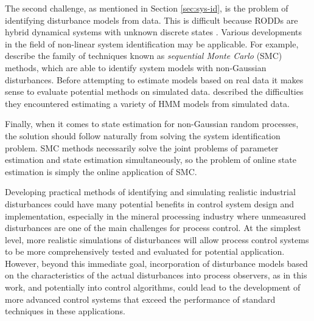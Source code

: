 The second challenge, as mentioned in Section \ref{sec:sys-id}, is the problem of identifying disturbance models from data. This is difficult because \gls{RODD}s are hybrid dynamical systems with unknown discrete states \citep{sworder_boyd_1999}. Various developments in the field of non-linear system identification may be applicable. For example, \cite{schon_sequential_2015} describe the family of techniques known as \textit{sequential Monte Carlo} (\gls{SMC}) methods, which are able to identify system models with non-Gaussian disturbances. Before attempting to estimate models based on real data it makes sense to evaluate potential methods on simulated data. \cite{wong_realistic_2009} described the difficulties they encountered estimating a variety of \gls{HMM} models from simulated data.

Finally, when it comes to state estimation for non-Gaussian random processes, the solution should follow naturally from solving the system identification problem. \gls{SMC} methods necessarily solve the joint problems of parameter estimation and state estimation simultaneously, so the problem of online state estimation is simply the online application of \gls{SMC}.

Developing practical methods of identifying and simulating realistic industrial disturbances could have many potential benefits in control system design and implementation, especially in the mineral processing industry where unmeasured disturbances are one of the main challenges for process control. At the simplest level, more realistic simulations of disturbances will allow process control systems to be more comprehensively tested and evaluated for potential application. However, beyond this immediate goal, incorporation of disturbance models based on the characteristics of the actual disturbances into process observers, as in this work, and potentially into control algorithms, could lead to the development of more advanced control systems that exceed the performance of standard techniques in these applications.
